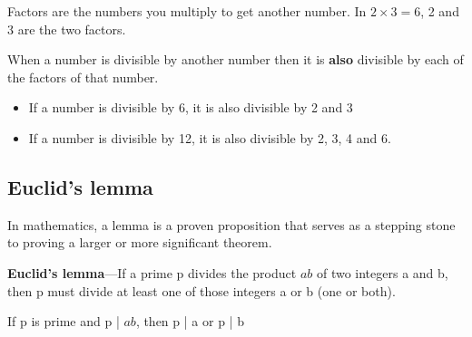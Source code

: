 Factors are the numbers you multiply to get another number. In $2 \times 3=6$, 2 and 3 are the two factors.

When a number is divisible by another number then it is \textbf{also} divisible by each of the factors of that number.

\begin{itemize}
  \item If a number is divisible by 6, it is also divisible by 2 and 3
  \item If a number is divisible by 12, it is also divisible by 2, 3, 4 and 6.
\end{itemize}

\subsection{Euclid's lemma}

In mathematics, a lemma is a proven proposition that serves as a stepping stone to proving a larger or more significant theorem.

\textbf{Euclid's lemma}—If a prime p divides the product $ab$ of two integers a and b, then p must divide at least one of those integers a or b (one or both).

If p is prime and p | $ab$, then p | a or p | b

